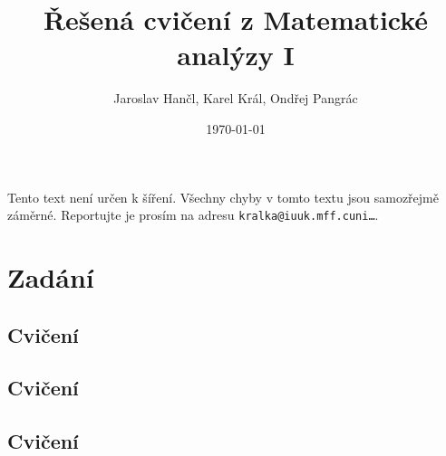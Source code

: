 \documentclass[a4paper,10pt]{book}
\title{Řešená cvičení z Matematické analýzy I}
\author{Jaroslav Hančl, Karel Král, Ondřej Pangrác}
\date{\today}
\begin{document}
\newtheorem{theorem}{Věta}
\newtheorem{lemma}[theorem]{Lemma}
\newtheorem{conjecture}[theorem]{Domněnka}
\newtheorem{observation}[theorem]{Pozorování}
\newtheorem{corollary}[theorem]{Důsledek}
\newtheorem*{definition}{Definice}

 \maketitle

 \vskip 1cm

 Tento text není určen k šíření.
 Všechny chyby v tomto textu jsou samozřejmě záměrné. Reportujte je prosím na adresu
 {\tt kralka@iuuk.mff.cuni\ldots}.

 \vskip 2cm
 \tableofcontents

 \newcommand{\dif}{\, \mathrm{d}} %
 \newcommand{\id}{\, \mathrm{id}} %
 \newcommand{\sgn}{\, \mathrm{sgn}} %
 \newcommand{\med}{\, \mathrm{med}} %
 \newcommand{\conv}{\, \mathrm{conv}} %
 \newcommand{\supp}{\, \mathrm{Supp}} %
 \newcommand{\Ker}{\, \mathrm{Ker}} %
 \renewcommand{\Im}{\, \mathrm{Im}} %
 \newcommand{\R}{\, \mathcal{R}} %

	\eject

\chapter{Zadání}
	\newcommand{\solution}[1]{}
	\newcommand{\exercise}[2]{ %
		

		Řešení: \ref{sol:#2}
	}
	\section[1. Cvičení]{Cvičení}
 
	\section[2. Cvičení]{Cvičení}
 
	\section[3. Cvičení]{Cvičení}
 
\end{document}
